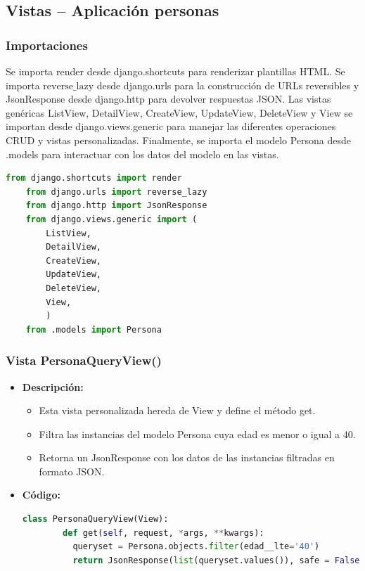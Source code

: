 \documentclass{article}
\begin{document}

  \subsection{Vistas -- Aplicación personas}
  
  
  \subsubsection{Importaciones}
  Se importa render desde django.shortcuts para renderizar plantillas HTML. Se importa $\text{reverse\_lazy}$ desde django.urls 
  para la construcción de URLs reversibles y JsonResponse desde django.http para devolver respuestas JSON. Las vistas 
  genéricas ListView, DetailView, CreateView, UpdateView, DeleteView y View se importan desde django.views.generic para 
  manejar las diferentes operaciones CRUD y vistas personalizadas. Finalmente, se importa el modelo Persona desde .models 
  para interactuar con los datos del modelo en las vistas.
  \begin{lstlisting}[language=Python]
    from django.shortcuts import render
    from django.urls import reverse_lazy
    from django.http import JsonResponse
    from django.views.generic import (
        ListView,
        DetailView,
        CreateView,
        UpdateView,
        DeleteView,
        View,
        )
    from .models import Persona
  \end{lstlisting} 
  
  
  \subsubsection{Vista PersonaQueryView()}
  \begin{itemize}
    \item \textbf{Descripción: }
    \begin{itemize}
      \item Esta vista personalizada hereda de View y define el método get.
      \item Filtra las instancias del modelo Persona cuya edad es menor o igual a 40.
      \item Retorna un JsonResponse con los datos de las instancias filtradas en formato JSON.
    \end{itemize}
    \item \textbf{Código: }
    \begin{lstlisting}[language=Python]
      class PersonaQueryView(View):
        def get(self, request, *args, **kwargs):
          queryset = Persona.objects.filter(edad__lte='40')
          return JsonResponse(list(queryset.values()), safe = False) 
    \end{lstlisting}   
  \end{itemize}
  \newpage
  
\end{document}
